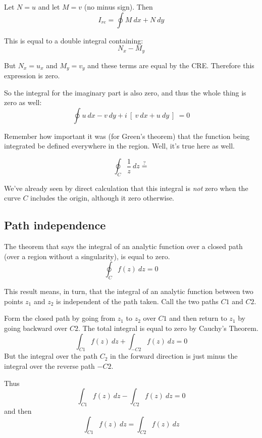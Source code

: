 \documentclass[11pt, oneside]{article}
\begin{document}
Let $N = u$ and let $M = v$ (no minus sign).  Then
\[ I_{re} = \oint M \ dx + N \ dy \]

This is equal to a double integral containing:
\[ N_x - M_y \]

But $N_x = u_x$ and $M_y = v_y$ and these terms are equal by the CRE.  Therefore this expression is zero.

So the integral for the imaginary part is also zero, and thus the whole thing is zero as well:
\[ \oint u \ dx - v \ dy + i \ [ \  v \ dx + u \ dy \ ] \ = 0 \]

Remember how important it was (for Green's theorem) that the function being integrated be defined everywhere in the region.  Well, it's true here as well.

\[ \oint_C \frac{1}{z} \ dz \stackrel{?}{=}  \]

We've already seen by direct calculation that this integral is \emph{not} zero when the curve $C$ includes the origin, although it zero otherwise.

\subsection*{Path independence}
The theorem that says the integral of an analytic function over a closed path (over a region without a singularity), is equal to zero.
\[ \oint_C f(z) \ dz = 0 \]

This result means, in turn, that the integral of an analytic function between two points $z_1$ and $z_2$ is independent of the path taken.  Call the two paths $C1$ and $C2$.  

Form the closed path by going from $z_1$ to $z_2$ over $C1$ and then return to $z_1$ by going backward over $C2$.  The total integral is equal to zero by Cauchy's Theorem.
\[ \int_{C1} f(z) \ dz + \int_{-C2} f(z) \ dz = 0 \]
But the integral over the path $C_2$ in the forward direction is just minus the integral over the reverse path $-C2$.

Thus
\[ \int_{C1} f(z) \ dz - \int_{C2} f(z) \ dz = 0 \]
and then
\[ \int_{C1} f(z) \ dz = \int_{C2} f(z) \ dz \]
\end{document}

